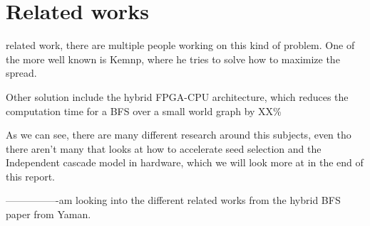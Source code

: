 \chapter{Related works}
related work, there are multiple people working on this kind of problem. One of the more well known is Kemnp, where he tries to solve how to maximize the spread. 


Other solution include the hybrid FPGA-CPU architecture, which reduces the computation time for a BFS over a small world graph by XX\%\cite{HybridBFS2015} 

As we can see, there are many different research around this subjects, even tho there aren't many that looks at how to accelerate seed selection and the Independent cascade model in hardware, which we will look more at in the end of this report.


----------------am looking into the different related works from the hybrid BFS paper from Yaman.
